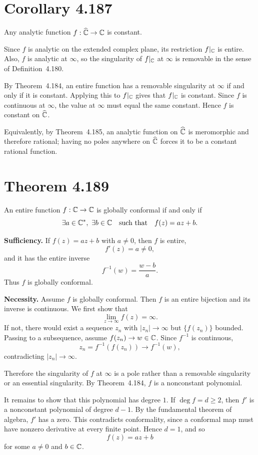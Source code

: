\documentclass{article}
\newcommand{\Chat}{\widehat{\C}}
\begin{document}
\section{Corollary 4.187}

Any analytic function $f:\Chat\to\C$ is constant.

\begin{solution}
  Since $f$ is analytic on the extended complex plane, its restriction
  $f|_{\mathbb{C}}$ is entire. Also, $f$ is analytic at $\infty$, so the singularity
  of $f|_{\mathbb{C}}$ at $\infty$ is removable in the sense of Definition~4.180.

  By Theorem~4.184, an entire function has a removable singularity at
  $\infty$ if and only if it is constant. Applying this to $f|_{\mathbb{C}}$ gives
  that $f|_{\mathbb{C}}$ is constant. Since $f$ is continuous at $\infty$, the value
  at $\infty$ must equal the same constant. Hence $f$ is constant on $\Chat$.

  Equivalently, by Theorem~4.185, an analytic function on $\Chat$ is
  meromorphic and therefore rational; having no poles anywhere on $\Chat$
  forces it to be a constant rational function.
\end{solution}

\section{Theorem 4.189}

An entire function $f:\mathbb{C}\to\mathbb{C}$ is globally conformal if and only if
\[
  \exists a\in\mathbb{C}^\ast,\ \exists b\in\mathbb{C}
  \quad\text{such that}\quad
  f(z)=az+b.
\]

\begin{solution}
  \textbf{Sufficiency.}
  If $f(z)=az+b$ with $a\ne 0$, then $f$ is entire,
  \[
    f'(z)=a\ne 0,
  \]
  and it has the entire inverse
  \[
    f^{-1}(w)=\frac{w-b}{a}.
  \]
  Thus $f$ is globally conformal.

  \medskip
  \noindent\textbf{Necessity.}
  Assume $f$ is globally conformal. Then $f$ is an entire bijection and its
  inverse is continuous. We first show that
  \[
    \lim_{z\to\infty} f(z)=\infty.
  \]
  If not, there would exist a sequence $z_n$ with $|z_n|\to\infty$ but
  $\{f(z_n)\}$ bounded. Passing to a subsequence, assume
  $f(z_n)\to w\in\mathbb{C}$. Since $f^{-1}$ is continuous,
  \[
    z_n=f^{-1}(f(z_n))\to f^{-1}(w),
  \]
  contradicting $|z_n|\to\infty$.

  Therefore the singularity of $f$ at $\infty$ is a pole rather than a
  removable singularity or an essential singularity. By Theorem~4.184, $f$ is
  a nonconstant polynomial.

  It remains to show that this polynomial has degree $1$. If
  $\deg f=d\ge 2$, then $f'$ is a nonconstant polynomial of degree $d-1$.
  By the fundamental theorem of algebra, $f'$ has a zero. This contradicts
  conformality, since a conformal map must have nonzero derivative at every
  finite point. Hence $d=1$, and so
  \[
    f(z)=az+b
  \]
  for some $a\ne 0$ and $b\in\mathbb{C}$.
\end{solution}
\end{document}
